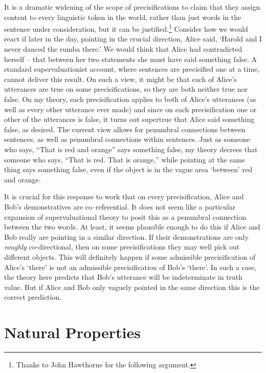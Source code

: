 It is a dramatic widening of the scope of precisifications to claim that they assign content to every linguistic token in the world, rather than just words in the sentence under consideration, but it can be justified.\footnote{Thanks to John Hawthorne for the following argument.} Consider how we would react if later in the day, pointing in the crucial direction, Alice said, `Harold and I never danced the rumba there.'  We would think that Alice had contradicted herself -- that between her two statements she must have said something false. A standard supervaluationist account, where sentences are precisified one at a time, cannot deliver this result. On such a view, it might be that each of Alice's utterances are true on some precisifications, so they are both neither true nor false. On my theory, each precisification applies to both of Alice's utterances (as well as every other utterance ever made) and since on each precisification one or other of the utterances is false, it turns out supertrue that Alice said something false, as desired. The current view allows for penumbral connections between sentences, as well as penumbral connections within sentences. Just as someone who says, ``That is red and orange'' says something false, my theory decrees that someone who says, ``That is red. That is orange,'' while pointing at the same thing says something false, even if the object is in the vague area `between' red and orange.

It is crucial for this response to work that on every precisification, Alice and Bob's demonstratives are co--referential. It does not seem like a particular expansion of supervaluational theory to posit this as a penumbral connection between the two words. At least, it seems plausible enough to do this if Alice and Bob really are pointing in a similar direction. If their demonstrations are only \textit{roughly }co-directional, then on some precisifications they may well pick out different objects. This will definitely happen if some admissible precisification of Alice's `there' is not an admissible precisification of Bob's `there'. In such a case, the theory here predicts that Bob's utterance will be indeterminate in truth value. But if Alice and Bob only vaguely pointed in the same direction this is the correct prediction.

\section{Natural Properties}

